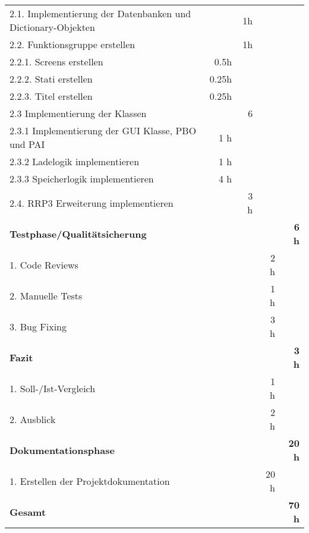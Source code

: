\begin{tabu}{lrrrr}
2.1. Implementierung der Datenbanken und Dictionary-Objekten & & 1h & & \\
2.2. Funktionsgruppe erstellen & & 1h & & \\
2.2.1. Screens erstellen & 0.5h & & & \\
2.2.2. Stati erstellen & 0.25h & & & \\
2.2.3. Titel erstellen & 0.25h & & & \\
2.3 Implementierung der Klassen & & 6 & & \\
2.3.1 Implementierung der GUI Klasse, PBO und PAI & 1 h & & & \\
2.3.2 Ladelogik implementieren & 1 h & & & \\
2.3.3 Speicherlogik implementieren & 4 h & & & \\
2.4. RRP3 Erweiterung implementieren & & 3 h & & \\
\rowfont{\color{headingfont}}\textbf{Testphase/Qualitätsicherung} & \textbf{} & \textbf{} & \textbf{} & \textbf{6 h} \\
1. Code Reviews & & & 2 h   &  \\
 2. Manuelle Tests & & & 1 h & \\
3. Bug Fixing & & & 3 h & \\
\rowfont{\color{headingfont}}\textbf{Fazit} & \textbf{} & \textbf{} & \textbf{} & \textbf{3 h} \\
1. Soll-/Ist-Vergleich & & & 1 h   &  \\
2. Ausblick & & & 2 h & \\
\rowfont{\color{headingfont}}\textbf{Dokumentationsphase} & \textbf{} & \textbf{} & \textbf{} & \textbf{20 h} \\1. Erstellen der Projektdokumentation & & & 20 h & \\
\hline
\hline
{}\textbf{Gesamt} & \textbf{} & \textbf{} & \textbf{} & \textbf{70 h} \\
\end{tabu}
